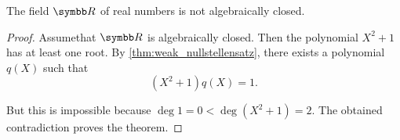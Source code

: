 \begin{corollary}\label{thm:nullstellensatz_implies_real_numbers_are_not_closed}
  The field \( \R \) of real numbers is not algebraically closed.
\end{corollary}
\begin{proof}
  Assume\LEM that \( \R \) is algebraically closed. Then the polynomial \( X^2 + 1 \) has at least one root. By \cref{thm:weak_nullstellensatz}, there exists a polynomial \( q(X) \) such that
  \begin{equation*}
    (X^2 + 1) q(X) = 1.
  \end{equation*}

  But this is impossible because \( \deg 1 = 0 < \deg(X^2 + 1) = 2 \). The obtained contradiction proves the theorem.
\end{proof}
